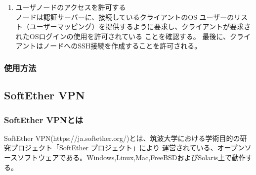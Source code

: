 \documentclass[12pt,a4paper,titlepage]{jsarticle}
\begin{document}
\begin{enumerate}[1:]
    \item ユーザノードのアクセスを許可する\mbox{}\\ノードは認証サーバーに、接続しているクライアントのOS
    ユーザーのリスト（ユーザーマッピング）を提供するように要求し、クライアントが要求されたOSログインの使用を許可されている
    ことを確認する。
    最後に、クライアントはノードへのSSH接続を作成することを許可される。

\end{enumerate}


\subsubsection*{使用方法}

\subsection{SoftEther VPN}

\subsubsection*{SoftEther VPNとは}

SoftEther VPN(https://ja.softether.org/)とは、筑波大学における学術目的の研究プロジェクト「SoftEther プロジェクト」により
運営されている、オープンソースソフトウェアである。Windows,Linux,Mac,FreeBSDおよびSolaris上で動作する。
\end{document}
